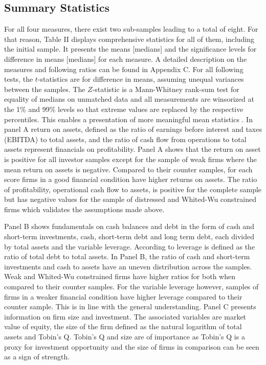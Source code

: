 \documentclass[12pt]{article}
\begin{document}
\subsection{Summary Statistics}
For all four measures, there exist two sub-samples leading to a total of eight. For that reason, Table II displays comprehensive statistics for all of them, including the initial sample. It presents the means [medians] and the significance levels for difference in means [medians] for each measure.
A detailed description on the measures and following ratios can be found in Appendix C. 
For all following tests, the $t$-statistics are for difference in means, assuming unequal variances between the samples. The $Z$-statistic is a Mann-Whitney rank-sum test for equality of medians on unmatched data and all measurements are winsorized at the 1\% and 99\% levels so that extreme values are replaced by the respective percentiles. This enables a presentation of more meaningful mean statistics \citep[p.203]{Klein2009}.
In panel A return on assets, defined as the ratio of earnings before interest and taxes (EBITDA) to total assets, and the ratio of cash flow from operations to total assets represent financials on profitability. Panel A shows that the return on asset is positive for all investor samples except for the sample of weak firms where the mean return on assets is negative. Compared to their counter samples, for each score firms in a good financial condition have higher returns on assets. The ratio of profitability, operational cash flow to assets, is positive for the complete sample but has negative values for the sample of distressed and Whited-Wu constrained firms which validates the assumptions made above.

Panel B shows fundamentals on cash balances and debt in the form of cash and short-term investments, cash, short-term debt and long term debt, each divided by total assets and the variable leverage. According to \citep{MacKay2005} leverage is defined as the ratio of total debt to total assets. 
In Panel B, the ratio of cash and short-term investments and cash to assets have an uneven distribution across the samples. Weak and Whited-Wu constrained firms have higher ratios for both when compared to their counter samples. For the variable leverage however, samples of firms in a weaker financial condition have higher leverage compared to their counter sample. This is in line with the general understanding.
Panel C presents information on firm size and investment. The associated variables are market value of equity, the size of the firm defined as the natural logarithm of total assets and Tobin's Q. Tobin's Q and size are of importance as Tobin's Q is a proxy for investment opportunity \citep[p.957]{DUCHIN2010} and the size of firms in comparison can be seen as a sign of strength. 
\end{document}
